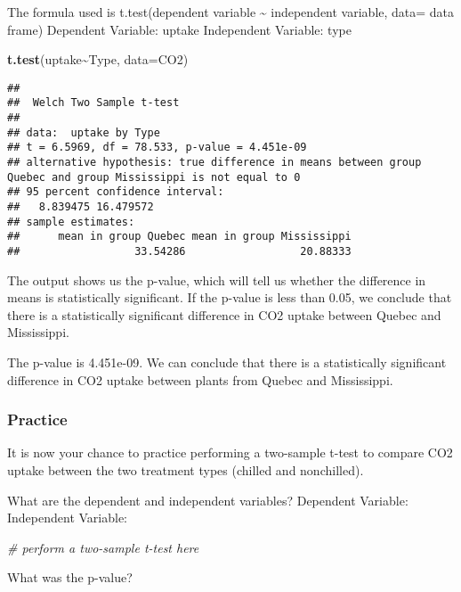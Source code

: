 \documentclass[
]{article}
\newenvironment{Shaded}{\begin{snugshade}}{\end{snugshade}}
\newcommand{\AttributeTok}[1]{\textcolor[rgb]{0.13,0.29,0.53}{#1}}
\newcommand{\CommentTok}[1]{\textcolor[rgb]{0.56,0.35,0.01}{\textit{#1}}}
\newcommand{\FunctionTok}[1]{\textcolor[rgb]{0.13,0.29,0.53}{\textbf{#1}}}
\newcommand{\NormalTok}[1]{#1}
\newcommand{\SpecialCharTok}[1]{\textcolor[rgb]{0.81,0.36,0.00}{\textbf{#1}}}
\begin{document}
The formula used is t.test(dependent variable \textasciitilde{}
independent variable, data= data frame) Dependent Variable: uptake
Independent Variable: type

\begin{Shaded}
\begin{Highlighting}[]
\FunctionTok{t.test}\NormalTok{(uptake}\SpecialCharTok{\textasciitilde{}}\NormalTok{Type, }\AttributeTok{data=}\NormalTok{CO2)}
\end{Highlighting}
\end{Shaded}

\begin{verbatim}
## 
##  Welch Two Sample t-test
## 
## data:  uptake by Type
## t = 6.5969, df = 78.533, p-value = 4.451e-09
## alternative hypothesis: true difference in means between group Quebec and group Mississippi is not equal to 0
## 95 percent confidence interval:
##   8.839475 16.479572
## sample estimates:
##      mean in group Quebec mean in group Mississippi 
##                  33.54286                  20.88333
\end{verbatim}

The output shows us the p-value, which will tell us whether the
difference in means is statistically significant. If the p-value is less
than 0.05, we conclude that there is a statistically significant
difference in CO2 uptake between Quebec and Mississippi.

The p-value is 4.451e-09. We can conclude that there is a statistically
significant difference in CO2 uptake between plants from Quebec and
Mississippi.

\subsubsection{Practice}\label{practice-1}

It is now your chance to practice performing a two-sample t-test to
compare CO2 uptake between the two treatment types (chilled and
nonchilled).

What are the dependent and independent variables? Dependent Variable:
Independent Variable:

\begin{Shaded}
\begin{Highlighting}[]
\CommentTok{\# perform a two{-}sample t{-}test here }
\end{Highlighting}
\end{Shaded}

What was the p-value?
\end{document}
